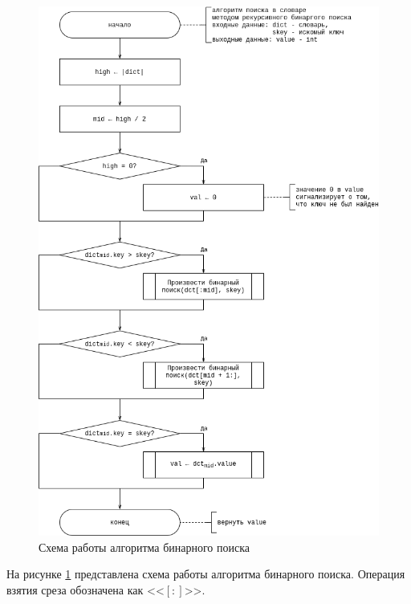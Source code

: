 \begin{center}
	\begin{figure}[H]
		\centering
		\includegraphics[width=0.83\linewidth]{assets/dict-binary.drawio.png}
		\caption{Схема работы алгоритма бинарного поиска}
		\label{fig:bin}
	\end{figure}
\end{center}

На рисунке \ref{fig:bin} представлена схема работы алгоритма бинарного поиска. Операция взятия среза обозначена как <<$[:]$>>.

